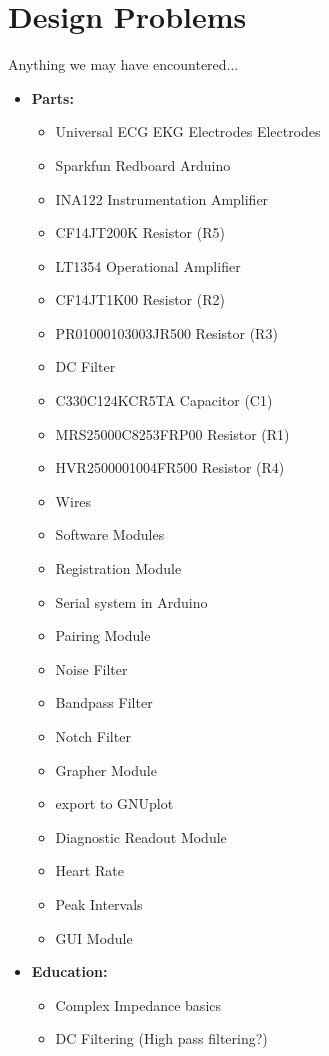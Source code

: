 \documentclass[11pt, oneside]{article}   	%
\begin{document}
\section{Design Problems}
Anything we may have encountered...
	\begin{itemize}[leftmargin=*]
		\item[] \textbf{Parts:}
			\begin{itemize} 
				\item Universal ECG EKG Electrodes Electrodes
				\item Sparkfun Redboard Arduino
				\item INA122 Instrumentation Amplifier 
					\item CF14JT200K Resistor (R5)
				\item LT1354 Operational Amplifier
					\item CF14JT1K00 Resistor (R2)
					\item PR01000103003JR500 Resistor (R3)
				\item DC Filter
					\item C330C124KCR5TA Capacitor (C1)
					\item MRS25000C8253FRP00 Resistor (R1)
					\item HVR2500001004FR500 Resistor (R4)
				\item Wires
				\item Software Modules
					\item Registration Module
						\item Serial system in Arduino
					\item Pairing Module
					\item Noise Filter
						\item Bandpass Filter
						\item Notch Filter
					\item Grapher Module
						\item export to GNUplot
					\item Diagnostic Readout Module
						\item Heart Rate
						\item Peak Intervals
					\item GUI Module
					
			\end{itemize}
		\item[] \textbf{Education:}
			\begin{itemize}
				\item Complex Impedance basics 
				\item DC Filtering (High pass filtering?)
			\end{itemize}
	\end{itemize}
\pagebreak
\end{document}
